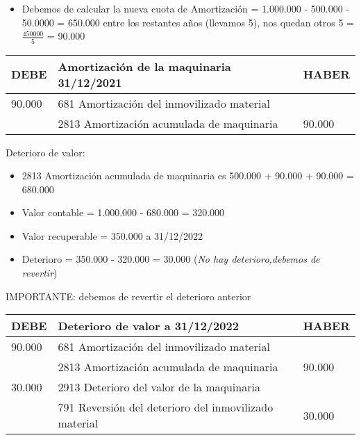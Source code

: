 \documentclass[a4paper,12pt]{article}
\newcommand{\fec}{31/12/}
\newcommand{\AIM}{681 Amortización del inmovilizado material }
\newcommand{\AAMAQ}{2813 Amortización acumulada de maquinaria }
\newcommand{\DVM}{2913 Deterioro del valor de la maquinaria }
\begin{document}
\begin{itemize}
    \item Debemos de calcular la nueva cuota de Amortización = 1.000.000 - 500.000 - 50.0000 = 650.000 entre los restantes años (llevamos 5), nos quedan otros 5 = $\frac{450000}{5}$ = 90.000
\end{itemize}

\begin{table}[H]
    \centering
    \begin{tabular}{|p{3cm}|p{6cm}|p{3cm}|}
    \hline
    \textbf{DEBE} & \textbf{Amortización de la maquinaria \fec2021} & \textbf{HABER} \\
    \hline
    90.000& \AIM & \\
    \hline
    & \AAMAQ & 90.000 \\
    \hline
    \end{tabular}
\end{table}

Deterioro de valor:
\begin{itemize}
    \item \AAMAQ es 500.000 + 90.000 + 90.000 = 680.000
    \item Valor contable = 1.000.000 - 680.000 = 320.000
    \item Valor recuperable = 350.000 a \fec2022
    \item Deterioro = 350.000 - 320.000 = 30.000 (\textit{No hay deterioro,debemos de revertir})
\end{itemize}

\begin{tcolorbox}[colback=blue!5!white, colframe=blue!75!black, title=Deterioro de valor]  
    IMPORTANTE: debemos de revertir el deterioro anterior
\end{tcolorbox}

\begin{table}[H]
    \centering
    \begin{tabular}{|p{3cm}|p{6cm}|p{3cm}|}
    \hline
    \textbf{DEBE} & \textbf{Deterioro de valor a \fec2022} & \textbf{HABER} \\
    \hline
    90.000& \AIM & \\
    \hline
    & \AAMAQ & 90.000\\
    \hline
    30.000& \DVM & \\
    \hline
    & 791 Reversión del deterioro del inmovilizado material & 30.000\\
    \hline
    \end{tabular}
\end{table}
\end{document}
